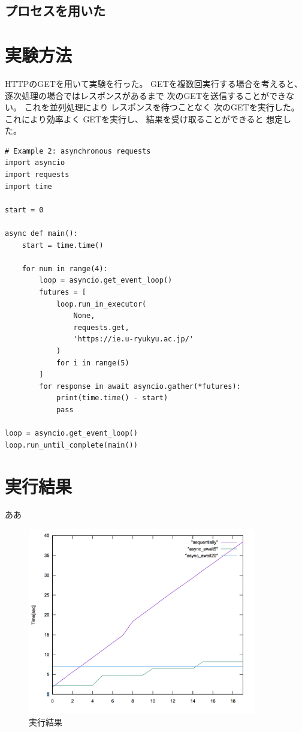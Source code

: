 \documentclass[14pt, oneside]{article}     	%
\begin{document}
\subsection{プロセスを用いた}


\section{実験方法}

HTTPのGETを用いて実験を行った。
GETを複数回実行する場合を考えると、
逐次処理の場合ではレスポンスがあるまで
次のGETを送信することができない。
これを並列処理により
レスポンスを待つことなく
次のGETを実行した。
これにより効率よく
GETを実行し、
結果を受け取ることができると
想定した。

\begin{lstlisting}[caption=シンプレクス法プログラム]
# Example 2: asynchronous requests
import asyncio
import requests
import time

start = 0

async def main():
    start = time.time()

    for num in range(4):
        loop = asyncio.get_event_loop()
        futures = [
            loop.run_in_executor(
                None,
                requests.get,
                'https://ie.u-ryukyu.ac.jp/'
            )
            for i in range(5)
        ]
        for response in await asyncio.gather(*futures):
            print(time.time() - start)
            pass

loop = asyncio.get_event_loop()
loop.run_until_complete(main())

\end{lstlisting}

\section{実行結果}

ああ

\begin{figure}[h]
  \centering
  \includegraphics[width=10cm]{time.png}
  \caption{実行結果}
\end{figure}
\end{document}

